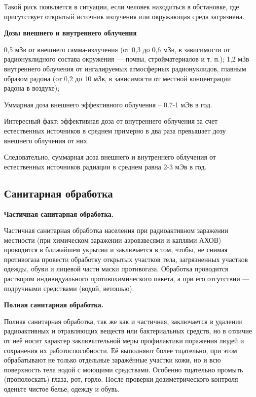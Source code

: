 \documentclass[a4paper, 12pt]{article}
\theoremstyle{definition}
\begin{document}
        Такой риск появляется в ситуации, если человек находиться в обстановке, где присутствует открытый источник излучения или окружающая среда загрязнена.
        \begin{center}
            \textbf{Дозы внешнего и внутреннего облучения} 
        \end{center}
        0,5 мЗв от внешнего гамма-излучения (от 0,3 до 0,6 мЗв, в зависимости от радионуклидного состава окружения — почвы, стройматериалов и т. п.); 1,2 мЗв внутреннего облучения от ингалируемых атмосферных радионуклидов, главным образом радона (от 0,2 до 10 мЗв, в зависимости от местной концентрации радона в воздухе);

        Уммарная доза внешнего эффективного облучения -- 0.7-1 мЭв в год.

        Интересный факт: эффективная доза от внутреннего облучения за счет естественных источников в среднем примерно в два раза превышает дозу внешнего облучения от них.

        Следовательно, суммарная доза внешнего и внутреннего облучения от естественных источников радиации в среднем равна 2-3 мЭв в год.
        \subsection{Санитарная обработка}
        \begin{center}
            \textbf{Частичная санитарная обработка.} 
        \end{center}

        Частичная санитарная обработка населения при радиоактивном заражении местности  (при химическом заражении      аэровзвесями и каплями АХОВ) проводится в ближайшем укрытии и заключается в том, чтобы, не снимая противогаза провести обработку открытых участков тела, загрязненных участков одежды, обуви и лицевой части маски противогаза. Обработка проводится раствором индивидуального противохимического пакета, а при его отсутствии — подручными средствами (водой, ветошью).
        \begin{center}
            \textbf{Полная санитарная обработка.} 
        \end{center}
        
        Полная санитарная обработка, так же как и частичная, заключается в удалении радиоактивных и отравляющих веществ или бактериальных средств, но в отличие от неё носит характер заключительной меры профилактики поражения людей и сохранения их работоспособности. Её выполняют более тщательно, при этом обрабатывают не только отдельные заражённые участки кожи, но и всю поверхность тела водой с моющими средствами. Особенно тщательно промыть (прополоскать) глаза, рот, горло.  После проверки дозиметрического контроля оденьте чистое белье, одежду и обувь. 
\end{document}
